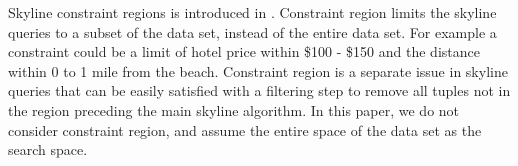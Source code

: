 

Skyline constraint regions is introduced in
\cite{Ha:2009:EEP:1616994.1617050}. Constraint region limits the
skyline queries to a subset of the data set, instead of the entire
data set. For example a constraint could be a limit of hotel price
within \$100 - \$150 and the distance within 0 to 1 mile from the
beach. Constraint region is a separate issue in skyline queries
that can be easily satisfied with a filtering step to remove all
tuples not in the region preceding the main skyline algorithm. In
this paper, we do not consider constraint region, and assume the
entire space of the data set as the search space.

